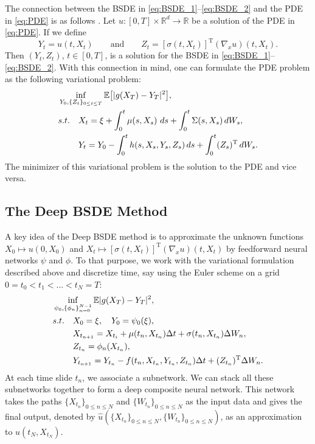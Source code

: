 \documentclass[12pt]{article}
\theoremstyle{definition}
\newcommand{\R}{\mathbb{R}}
\newcommand{\E}{\mathbb{E}}
\newcommand{\transpose}{^{\operatorname{T}}}
\begin{document}
The connection between the BSDE in \eqref{eq:BSDE_1}--\eqref{eq:BSDE_2} 
and the PDE in \eqref{eq:PDE} is as follows \cite{Pardoux1992,Pardoux1999}.
Let $ u \colon [0,T] \times \R^d \to \R $ be a solution of the PDE in \eqref{eq:PDE}. 
If we define
\begin{equation}
\label{eq:nonlinear_Feynman_Kac}
  Y_t = u( t, X_t )
\qquad  
  \text{and}
\qquad 
  Z_t = [ \sigma( t, X_t ) ]^{ \operatorname{T} }  
  ( \nabla_x u )( t, X_t ).
\end{equation}
Then $ ( Y_t, Z_t ) $, $ t \in [0,T] $, is a solution for the BSDE in \eqref{eq:BSDE_1}--\eqref{eq:BSDE_2}.
%
With this connection in mind, one can formulate the PDE problem as 
the following variational problem:
\begin{align}
&\inf_{Y_0,\{Z_t\}_{0\le t \le T}} \E\big[ |g(X_T) - Y_T|^2 \big], \\
&s.t.\quad X_t = \xi + \int_{0}^{t}\mu(s,X_s)\, \,ds + \int_{0}^{t}\Sigma(s,X_s)\, dW_s, \\
&\hphantom{s.t.}\quad Y_t = Y_0 - \int_{0}^{t}h(s,X_s,Y_s,Z_s)\,  ds + \int_{0}^{t}(Z_s)\transpose\, dW_s.
\end{align}
The  minimizer of this variational problem is the solution to the PDE and vice versa.

\subsection{The Deep BSDE Method}

A key idea of the Deep BSDE method 
is to approximate the unknown functions
    $X_0 \mapsto u(0, X_0)$ {and}
    $X_t \mapsto [ \sigma(t,X_t) ]^{ \operatorname{T} } ( \nabla_x u )(t,X_t)$
    by feedforward neural networks $\psi$ and $\phi$.  To that purpose, we 
    work with the variational formulation described above and  discretize time, say using the Euler 
scheme on a grid $0 = t_0 < t_1 < \ldots < t_N = T$:
    \begin{align}
    &\inf_{\psi_0, \{\phi_n\}_{n=0}^{N-1}} \E |g(X_T) - Y_T|^2, \\
    &s.t.\quad X_0 = \xi, \quad Y_0 = \psi_0(\xi), \\
    &\hphantom{s.t.}\quad X_{t_{n+1}} = X_{t_i} + \mu(t_n,X_{t_n})\Delta t + \sigma(t_n,X_{t_n})\Delta W_n, \\
    &\hphantom{s.t.}\quad Z_{t_n} = \phi_n(X_{t_n}), \\
    &\hphantom{s.t.}\quad Y_{t_{n+1}} = Y_{t_n} - f(t_n,X_{t_n},Y_{t_n},Z_{t_n})\Delta t + (Z_{t_n})\transpose\Delta W_n.
    \end{align}
 At each time slide $t_n$, we associate a subnetwork.
 We can stack all these subnetworks together to form a deep composite neural 
    network. This network takes the paths 
    $\{ X_{ t_n } \}_{ 0 \leq n \leq N }$ and 
    $\{ W_{ t_n } \}_{ 0 \leq n \leq N }$ 
    as the input data and gives the final output, denoted by
        $\hat{u}( 
        \{ { X_{ t_n } } \}_{ 0 \leq n \leq N } , 
        \{ W_{ t_n } \}_{ 0 \leq n \leq N } )$, 
    as an approximation to 
    $u( t_N, X_{ t_N } )$. 
    
\end{document}
